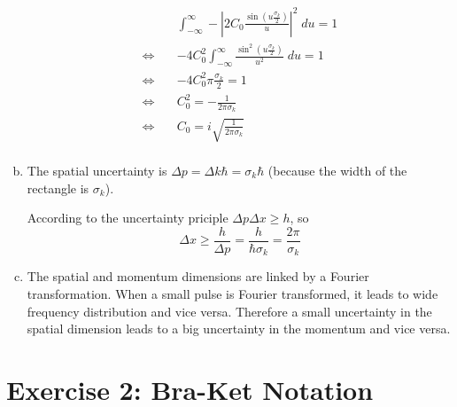 \documentclass[a4paper,german,12pt,smallheadings]{scrartcl}
\begin{document}
\begin{enumerate}[a)]
    \begin{align*}
      &\int_{-\infty}^{\infty} -\left|2C_0 \frac{\sin\left(u \frac{\sigma_k}{2}\right)}{u}\right|^2 \; du = 1 \\
      \Leftrightarrow\quad&
      -4C_0^2 \int_{-\infty}^{\infty} \frac{\sin^2\left(u \frac{\sigma_k}{2}\right)}{u^2} \; du = 1 \\
      \Leftrightarrow\quad&
      -4C_0^2 \pi \frac{\sigma_k}{2} = 1 \\
      \Leftrightarrow\quad&
      C_0^2 = -\frac{1}{2\pi \sigma_k}  \\
      \Leftrightarrow\quad&
      C_0 = i \sqrt{\frac{1}{2 \pi \sigma_k}} \\
    \end{align*}

  \item
    The spatial uncertainty is $\Delta p = \Delta k \hbar = \sigma_k \hbar$
    (because the width of the rectangle is $\sigma_k$).

    According to the uncertainty priciple $\Delta p \Delta x \ge h$, so
    \begin{equation*}
      \Delta x \ge \frac{h}{\Delta p} = \frac{h}{\hbar \sigma_k} = \frac{2 \pi}{\sigma_k}
    \end{equation*}

  \item
    The spatial and momentum dimensions are linked by a Fourier transformation.
    When a small pulse is Fourier transformed, it leads to wide frequency
    distribution and vice versa. Therefore a small uncertainty in the spatial
    dimension leads to a big uncertainty in the momentum and vice versa.

\end{enumerate}

\section*{Exercise 2: Bra-Ket Notation}
\end{document}
